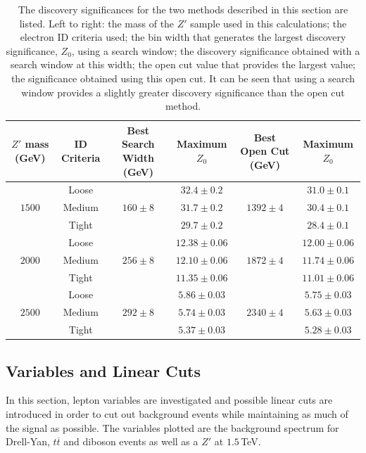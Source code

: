 \documentclass{article}
\begin{document}
\begin{table}[h!t]
\centering
\caption{The discovery significances for the two methods described in this section are listed. Left to right: the mass of the $Z'$ sample used in this calculations; the electron ID criteria used; the bin width that generates the largest discovery significance, $Z_0$, using a search window; the discovery significance obtained with a search window at this width; the open cut value that provides the largest value; the significance obtained using this open cut. It can be seen that using a search window provides a slightly greater discovery significance than the open cut method. \label{table:discoverySignificance}
}
\begin{tabular}{ |c|c|c|c|c|c| } 
\hline
$Z'$ mass (GeV) &  ID Criteria & Best Search Width (GeV) & Maximum $Z_0$ & Best Open Cut (GeV) &Maximum $Z_0$\\
\hline
\multirow{3}{*}{$1500$}  & Loose & \multirow{3}{*}{$160\pm8$}& $32.4\pm0.2$ & \multirow{3}{*}{$1392\pm4$} &$31.0\pm0.1$ \\\cline{2-2}\cline{4-4}\cline{6-6}
& Medium  & & $31.7\pm0.2$ & & $30.4\pm0.1$\\\cline{2-2}\cline{4-4}\cline{6-6}
& Tight &  & $29.7\pm0.2$ & & $28.4\pm0.1$\\\hline
\multirow{3}{*}{$2000$} & Loose & \multirow{3}{*}{$256\pm8$}& $12.38\pm0.06$ & \multirow{3}{*}{$1872\pm4$} & $12.00\pm0.06$\\\cline{2-2}\cline{4-4}\cline{6-6}
&  Medium & & $12.10\pm0.06$ & & $11.74\pm0.06$ \\\cline{2-2}\cline{4-4}\cline{6-6}
&  Tight & & $11.35\pm0.06$ & & $11.01\pm0.06$\\\hline
\multirow{3}{*}{$2500$} &  Loose & \multirow{3}{*}{$292\pm8$}& $5.86\pm0.03$ & \multirow{3}{*}{$2340\pm4$} & $5.75\pm0.03$ \\\cline{2-2}\cline{4-4}\cline{6-6}
&  Medium & & $5.74\pm0.03$ & & $5.63\pm0.03$\\\cline{2-2}\cline{4-4}\cline{6-6}
&  Tight  & & $5.37\pm0.03$ & & $5.28\pm0.03$\\\hline
\end{tabular}
\end{table}

\subsection{Variables and Linear Cuts}
\label{sec:MCA_variables}

In this section, lepton variables are investigated and possible linear cuts are introduced in order to cut out background events while maintaining as much of the signal as possible. The variables plotted are the background spectrum for Drell-Yan, $t\overline{t}$ and diboson events as well as a $Z'$ at $1.5\,$TeV.
\end{document}
